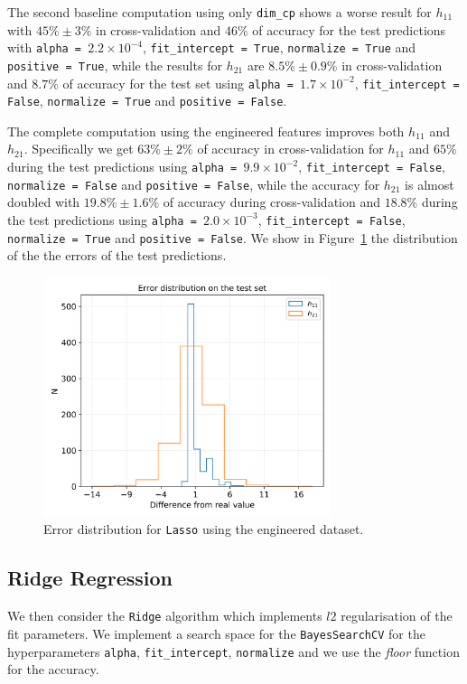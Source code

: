    The second baseline computation using only \texttt{dim\_cp} shows a worse result for $h_{11}$ with $45\% \pm 3\%$ in cross-validation and $46\%$ of accuracy for the test predictions with \texttt{alpha = $2.2 \times 10^{-4}$}, \texttt{fit\_intercept = True}, \texttt{normalize = True} and \texttt{positive = True}, while the results for $h_{21}$ are $8.5\% \pm 0.9\%$ in cross-validation and $8.7\%$ of accuracy for the test set using \texttt{alpha = $1.7 \times 10^{-2}$}, \texttt{fit\_intercept = False}, \texttt{normalize = True} and \texttt{positive = False}.
    
    The complete computation using the engineered features improves both $h_{11}$ and $h_{21}$. Specifically we get $63\% \pm 2\%$ of accuracy in cross-validation for $h_{11}$ and $65\%$ during the test predictions using \texttt{alpha = $9.9 \times 10^{-2}$}, \texttt{fit\_intercept = False}, \texttt{normalize = False} and \texttt{positive = False}, while the accuracy for $h_{21}$ is almost doubled with $19.8\% \pm 1.6\%$ of accuracy during cross-validation and $18.8\%$ during the test predictions using \texttt{alpha = $2.0 \times 10^{-3}$}, \texttt{fit\_intercept = False}, \texttt{normalize = True} and \texttt{positive = False}. We show in Figure~\ref{fig:lasso_err} the distribution of the the errors of the test predictions.
    
    \begin{figure}[t]
        \centering
        \includegraphics[width=0.75\textwidth]{tex/img/lasso_error_eng.png}
        \caption{Error distribution for \texttt{Lasso} using the engineered dataset.}
        \label{fig:lasso_err}
    \end{figure}
    
\subsection{Ridge Regression}
    We then consider the \texttt{Ridge} algorithm which implements $l2$ regularisation of the fit parameters. We implement a search space for the \texttt{BayesSearchCV} for the hyperparameters \texttt{alpha}, \texttt{fit\_intercept}, \texttt{normalize} and we use the \textit{floor} function for the accuracy.
    
